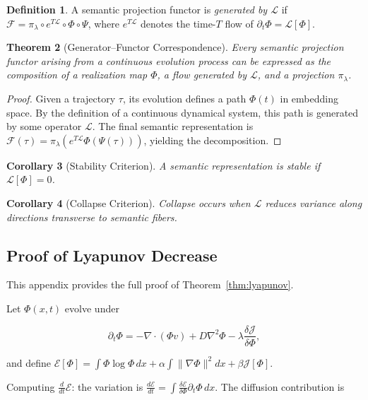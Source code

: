 \documentclass[11pt, twoside]{article}
\theoremstyle{plain}
\newtheorem{theorem}{Theorem}[section]
\newtheorem{corollary}[theorem]{Corollary}
\theoremstyle{definition}
\newtheorem{definition}[theorem]{Definition}
\theoremstyle{remark}
\begin{document}
\begin{definition}
A semantic projection functor is \emph{generated by $\mathcal{L}$} if $\mathcal{F} = \pi_\lambda \circ e^{T\mathcal{L}} \circ \Phi \circ \Psi$, where $e^{T\mathcal{L}}$ denotes the time-$T$ flow of $\partial_t \Phi = \mathcal{L}[\Phi]$.
\end{definition}

\begin{theorem}[Generator--Functor Correspondence]
Every semantic projection functor arising from a continuous evolution process can be expressed as the composition of a realization map $\Phi$, a flow generated by $\mathcal{L}$, and a projection $\pi_\lambda$.
\end{theorem}

\begin{proof}
Given a trajectory $\tau$, its evolution defines a path $\Phi(t)$ in embedding space. By the definition of a continuous dynamical system, this path is generated by some operator $\mathcal{L}$. The final semantic representation is $\mathcal{F}(\tau) = \pi_\lambda(e^{T\mathcal{L}} \Phi(\Psi(\tau)))$, yielding the decomposition.
\end{proof}

\begin{corollary}[Stability Criterion]
A semantic representation is stable if $\mathcal{L}[\Phi] = 0$.
\end{corollary}

\begin{corollary}[Collapse Criterion]
Collapse occurs when $\mathcal{L}$ reduces variance along directions transverse to semantic fibers.
\end{corollary}

\subsection{Proof of Lyapunov Decrease}

This appendix provides the full proof of Theorem~\ref{thm:lyapunov}.

Let $\Phi(x,t)$ evolve under

\[
\partial_t \Phi = -\nabla \cdot (\Phi v) + D \nabla^2 \Phi - \lambda \frac{\delta \mathcal{J}}{\delta \Phi},
\]

and define $\mathcal{E}[\Phi] = \int \Phi \log \Phi \, dx + \alpha \int \|\nabla\Phi\|^2 dx + \beta \mathcal{J}[\Phi]$.

Computing $\frac{d}{dt}\mathcal{E}$: the variation is $\frac{d\mathcal{E}}{dt} = \int \frac{\delta\mathcal{E}}{\delta\Phi} \partial_t \Phi \, dx$. The diffusion contribution is
\end{document}
